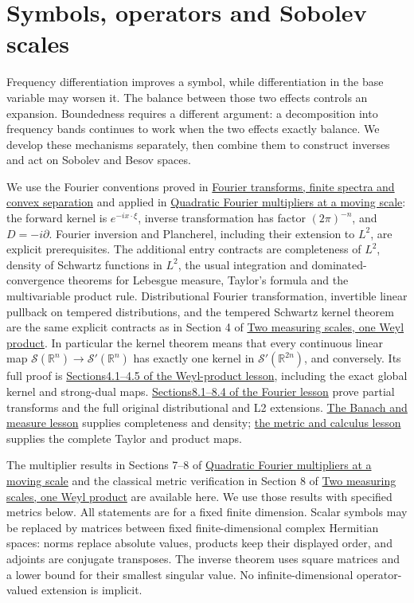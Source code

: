 \documentclass[
  11pt,
]{article}
\author{}
\date{}
\begin{document}
\section{Symbols, operators and Sobolev
scales}\label{symbols-operators-and-sobolev-scales}

Frequency differentiation improves a symbol, while differentiation in
the base variable may worsen it. The balance between those two effects
controls an expansion. Boundedness requires a different argument: a
decomposition into frequency bands continues to work when the two
effects exactly balance. We develop these mechanisms separately, then
combine them to construct inverses and act on Sobolev and Besov spaces.

We use the Fourier conventions proved in
\href{prerequisite-bridges.pdf}{Fourier transforms, finite spectra and
convex separation} and applied in
\href{gauss-transform-estimates.pdf}{Quadratic Fourier multipliers at a
moving scale}: the forward kernel is \(e^{-ix\cdot\xi}\), inverse
transformation has factor \((2\pi)^{-n}\), and \(D=-i\partial\). Fourier
inversion and Plancherel, including their extension to \(L^2\), are
explicit prerequisites. The additional entry contracts are completeness
of \(L^2\), density of Schwartz functions in \(L^2\), the usual
integration and dominated-convergence theorems for Lebesgue measure,
Taylor's formula and the multivariable product rule. Distributional
Fourier transformation, invertible linear pullback on tempered
distributions, and the tempered Schwartz kernel theorem are the same
explicit contracts as in Section 4 of \href{weyl-metric-products.pdf}{Two
measuring scales, one Weyl product}. In particular the kernel theorem
means that every continuous linear map
\(\mathcal S(\mathbb R^n)\to\mathcal S'(\mathbb R^n)\) has exactly one
kernel in \(\mathcal S'(\mathbb R^{2n})\), and conversely. Its full
proof is
\href{weyl-metric-products.pdf\#section*.27}{Sections4.1--4.5 of
the Weyl-product lesson}, including the exact global kernel and
strong-dual maps.
\href{prerequisite-bridges.pdf\#section*.31}{Sections8.1--8.4 of
the Fourier lesson} prove partial transforms and the full original
distributional and L2 extensions.
\href{banach-foundation-bridges.pdf\#section*.94}{The Banach and
measure lesson} supplies completeness and density;
\href{metric-foundation-bridges.pdf\#section*.106}{the metric and
calculus lesson} supplies the complete Taylor and product maps.

The multiplier results in Sections 7--8 of
\href{gauss-transform-estimates.pdf}{Quadratic Fourier multipliers at a
moving scale} and the classical metric verification in Section 8 of
\href{weyl-metric-products.pdf}{Two measuring scales, one Weyl product}
are available here. We use those results with specified metrics below.
All statements are for a fixed finite dimension. Scalar symbols may be
replaced by matrices between fixed finite-dimensional complex Hermitian
spaces: norms replace absolute values, products keep their displayed
order, and adjoints are conjugate transposes. The inverse theorem uses
square matrices and a lower bound for their smallest singular value. No
infinite-dimensional operator-valued extension is implicit.
\end{document}
